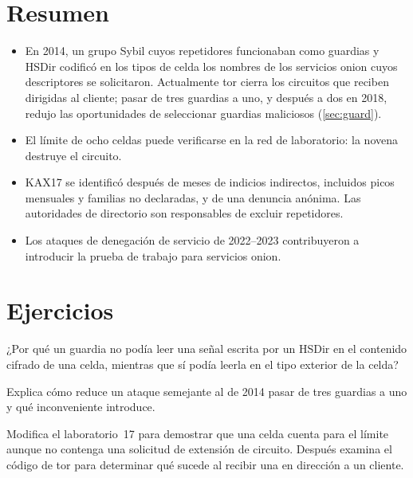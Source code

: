 \section*{Resumen}
\begin{itemize}
  \item En 2014, un grupo Sybil cuyos repetidores funcionaban como guardias y HSDir codificó en los tipos de celda los nombres de los servicios onion cuyos descriptores se solicitaron. Actualmente tor cierra los circuitos que reciben  dirigidas al cliente; pasar de tres guardias a uno, y después a dos en 2018, redujo las oportunidades de seleccionar guardias maliciosos (\cref{sec:guard}).
  \item El límite de ocho celdas  puede verificarse en la red de laboratorio: la novena destruye el circuito.
  \item KAX17 se identificó después de meses de indicios indirectos, incluidos picos mensuales y familias no declaradas, y de una denuncia anónima. Las autoridades de directorio son responsables de excluir repetidores.
  \item Los ataques de denegación de servicio de 2022--2023 contribuyeron a introducir la prueba de trabajo para servicios onion.
\end{itemize}

\section*{Ejercicios}

\begin{esercizio}[1]\label{es:27-campo}
¿Por qué un guardia no podía leer una señal escrita por un HSDir en el contenido cifrado de una celda, mientras que sí podía leerla en el tipo exterior de la celda?
\end{esercizio}

\begin{esercizio}[1]\label{es:27-uno}
Explica cómo reduce un ataque semejante al de 2014 pasar de tres guardias a uno y qué inconveniente introduce.
\end{esercizio}

\begin{esercizio}[2]\label{es:27-verso}
Modifica el laboratorio~17 para demostrar que una celda  cuenta para el límite aunque no contenga una solicitud de extensión de circuito. Después examina el código de tor para determinar qué sucede al recibir una  en dirección a un cliente.
\end{esercizio}

